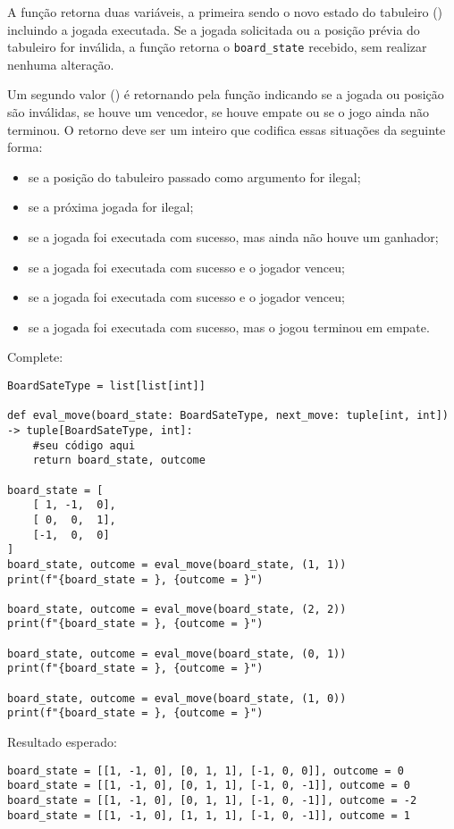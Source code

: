 A função retorna duas variáveis, a primeira sendo o novo estado do tabuleiro () incluindo a jogada executada.
Se a jogada solicitada ou a posição prévia do tabuleiro for inválida, a função retorna o \texttt{board\_state} recebido, sem realizar nenhuma alteração.

Um segundo valor () é retornando pela função indicando se a jogada ou posição são inválidas, se houve um vencedor,
se houve empate ou se o jogo ainda não terminou.
O retorno  deve ser um inteiro que codifica essas situações da seguinte forma:
\begin{itemize}
\item {} se a posição do tabuleiro passado como argumento for ilegal;
\item {} se a próxima jogada for ilegal;
\item {} se a jogada foi executada com sucesso, mas ainda não houve um ganhador;
\item {} se a jogada foi executada com sucesso e o jogador \1 venceu;
\item {} se a jogada foi executada com sucesso e o jogador \2 venceu;
\item {} se a jogada foi executada com sucesso, mas o jogou terminou em empate.
\end{itemize}

Complete:
\begin{verbatim}
BoardSateType = list[list[int]]

def eval_move(board_state: BoardSateType, next_move: tuple[int, int]) -> tuple[BoardSateType, int]:
    #seu código aqui
    return board_state, outcome

board_state = [
    [ 1, -1,  0],
    [ 0,  0,  1],
    [-1,  0,  0]
]
board_state, outcome = eval_move(board_state, (1, 1))
print(f"{board_state = }, {outcome = }")

board_state, outcome = eval_move(board_state, (2, 2))
print(f"{board_state = }, {outcome = }")

board_state, outcome = eval_move(board_state, (0, 1))
print(f"{board_state = }, {outcome = }")

board_state, outcome = eval_move(board_state, (1, 0))
print(f"{board_state = }, {outcome = }")
\end{verbatim}

Resultado esperado:
\begin{verbatim}
board_state = [[1, -1, 0], [0, 1, 1], [-1, 0, 0]], outcome = 0
board_state = [[1, -1, 0], [0, 1, 1], [-1, 0, -1]], outcome = 0
board_state = [[1, -1, 0], [0, 1, 1], [-1, 0, -1]], outcome = -2
board_state = [[1, -1, 0], [1, 1, 1], [-1, 0, -1]], outcome = 1
\end{verbatim}

